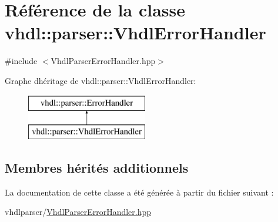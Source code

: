 \hypertarget{classvhdl_1_1parser_1_1_vhdl_error_handler}{}\section{Référence de la classe vhdl\+:\+:parser\+:\+:Vhdl\+Error\+Handler}
\label{classvhdl_1_1parser_1_1_vhdl_error_handler}


{\ttfamily \#include $<$Vhdl\+Parser\+Error\+Handler.\+hpp$>$}

Graphe d\textquotesingle{}héritage de vhdl\+:\+:parser\+:\+:Vhdl\+Error\+Handler\+:\begin{figure}[H]
\begin{center}
\leavevmode
\includegraphics[height=2.000000cm]{classvhdl_1_1parser_1_1_vhdl_error_handler}
\end{center}
\end{figure}
\subsection*{Membres hérités additionnels}


La documentation de cette classe a été générée à partir du fichier suivant \+:\begin{DoxyCompactItemize}
\item 
vhdlparser/\hyperlink{_vhdl_parser_error_handler_8hpp}{Vhdl\+Parser\+Error\+Handler.\+hpp}\end{DoxyCompactItemize}
